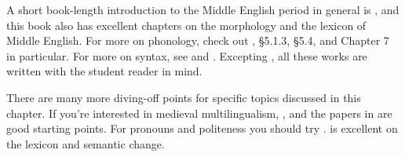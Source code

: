 \begin{furtherreading}
A short book-length introduction to the Middle English period in general is \citet{HorobinSmith2002}, and this book also has excellent chapters on the morphology and the lexicon of Middle English. For more on phonology, check out \citet{Minkova2014}, §5.1.3, §5.4, and Chapter 7 in particular. For more on syntax, see \citet[Chapter 4]{Los2015} and \citet{FischerDeSmetvanderWurff2017}. Excepting \citet{Minkova2014}, all these works are written with the student reader in mind.

There are many more diving-off points for specific topics discussed in this chapter. If you're interested in medieval multilingualism, \citet{Davidson2010}, \citet{Hsy2013} and the papers in \citet{JeffersonPutter2013} are good starting points. For pronouns and politeness you should try \citet{Burnley2003}. \citet{Sylvester2017} is excellent on the lexicon and semantic change.
\end{furtherreading}
\clearpage
